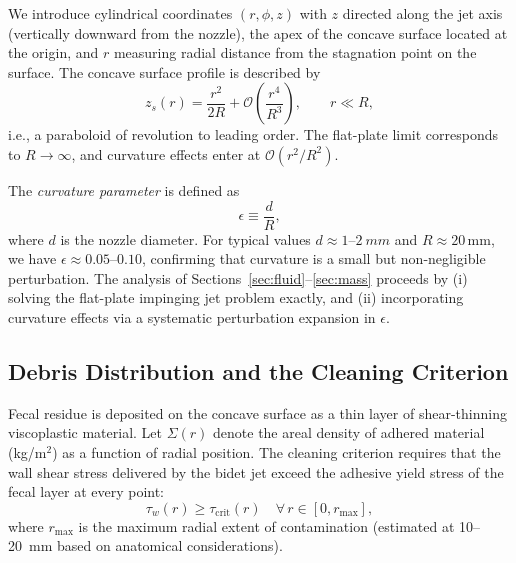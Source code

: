\documentclass[aps,prfluids,reprint,amsmath,amssymb,floatfix]{revtex4-2}
\begin{document}
We introduce cylindrical coordinates $(r, \phi, z)$ with $z$ directed along
the jet axis (vertically downward from the nozzle), the apex of the concave
surface located at the origin, and $r$ measuring radial distance from the
stagnation point on the surface. The concave surface profile is described by
\begin{equation}
    z_s(r) = \frac{r^2}{2R} + \mathcal{O}\!\left(\frac{r^4}{R^3}\right),
    \qquad r \ll R,
    \label{eq:surfaceprofile}
\end{equation}
i.e., a paraboloid of revolution to leading order. The flat-plate limit
corresponds to $R \to \infty$, and curvature effects enter at
$\mathcal{O}(r^2/R^2)$.

The \emph{curvature parameter} is defined as
\begin{equation}
    \epsilon \equiv \frac{d}{R},
    \label{eq:curvparam}
\end{equation}
where $d$ is the nozzle diameter. For typical values $d \approx 1$--$\SI{2}{mm}$
and $R \approx 20\,\mathrm{mm}$, we have $\epsilon \approx 0.05$--$0.10$,
confirming that curvature is a small but non-negligible perturbation. The
analysis of Sections~\ref{sec:fluid}--\ref{sec:mass} proceeds by (i)
solving the flat-plate impinging jet problem exactly, and (ii) incorporating
curvature effects via a systematic perturbation expansion in $\epsilon$.

\subsection{Debris Distribution and the Cleaning Criterion}

Fecal residue is deposited on the concave surface as a thin layer of
shear-thinning viscoplastic material. Let $\Sigma(r)$ denote the areal
density of adhered material (kg/m$^2$) as a function of radial position.
The cleaning criterion requires that the wall shear stress delivered by the
bidet jet exceed the adhesive yield stress of the fecal layer at every point:
\begin{equation}
    \tau_w(r) \geq \tau_\mathrm{crit}(r) \quad \forall\, r \in [0, r_\mathrm{max}],
    \label{eq:cleaningcriterion}
\end{equation}
where $r_\mathrm{max}$ is the maximum radial extent of contamination (estimated
at 10--\SI{20}{mm} based on anatomical considerations).
\end{document}
